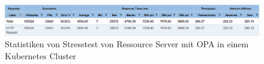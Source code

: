  \begin{figure}[H]
    \centering
    \includegraphics[width=1.0\textwidth]{gfx/statistik-stress-opa-k8s.png}
    \caption{Statistiken von Stresstest von Ressource Server mit OPA in einem Kubernetes Cluster}
    \label{fig:chapter04:statistik-stress-opa-k8s}
  \end{figure}